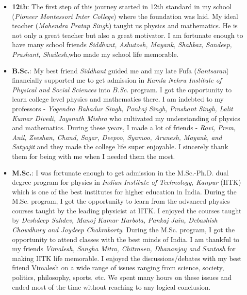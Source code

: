 \begin{itemize} [leftmargin=*]
\item \textbf{12th}:
The first step of this journey started in 12th standard in my school (\textit{Pioneer Montessori Inter College}) where the foundation was laid. My ideal teacher (\textit{Mahendra Pratap Singh}) taught us physics and mathematics. He is not only a great teacher but also a great motivator. I am fortunate enough to have many school friends \textit{Siddhant, Ashutosh, Mayank, Shahbaz, Sandeep, Prashant, Shailesh},who made my school life memorable.

\item \textbf{B.Sc.}:
My best friend \textit{Siddhant} guided me and my late Fufa 
(\textit{Santsaran}) financially supported me to get admission in \textit{Kamla 
Nehru Institute of Physical and Social Sciences} into $B.Sc.$ program. I got the opportunity to learn college level physics and mathematics there. I am indebted to my professors - \textit{
Yogendra Bahadur Singh, Pankaj Singh, Prashant Singh, Lalit Kumar Divedi, Jaysnath 
Mishra} who cultivated my understanding of physics and mathematics. During these 
years, I made a lot of friends - \textit{Ravi, Prem, Anil,
Zeeshan, Chand, Sagar, Deepoo, Syamoo, Arunesh, Mayank, and Satyajit} and they made 
the college life super enjoyable. I sincerely thank them for being with me when
I needed them the most.

\item \textbf{M.Sc.}:
I was fortunate enough to get admission in the M.Sc.-Ph.D. dual degree 
program for physics in \textit{Indian Institute of Technology, Kanpur} (IITK) 
which is one of the best institutes for higher education in India. During the
M.Sc. program, I got the opportunity to learn from the advanced physics courses taught by the leading physicist at IITK. I enjoyed the courses taught by \textit{
Deshdeep Sahdev, Manoj Kumar Harbola, Pankaj Jain, Debashish Chowdhury and Joydeep Chakraborty}. During the M.Sc. program, I got the opportunity to attend classes with the best minds of India. I am thankful to my friends \textit{Vimalesh, Sangha Mitra, Chitrasen, Dhananjay and Santosh} for making
IITK life memorable. I enjoyed the discussions/debates with my best friend
Vimalesh on a wide range of issues ranging from science, society, politics, 
philosophy, sports, etc. We spent many hours on these issues and ended most of
the time without reaching to any logical conclusion. 


\end{itemize}
